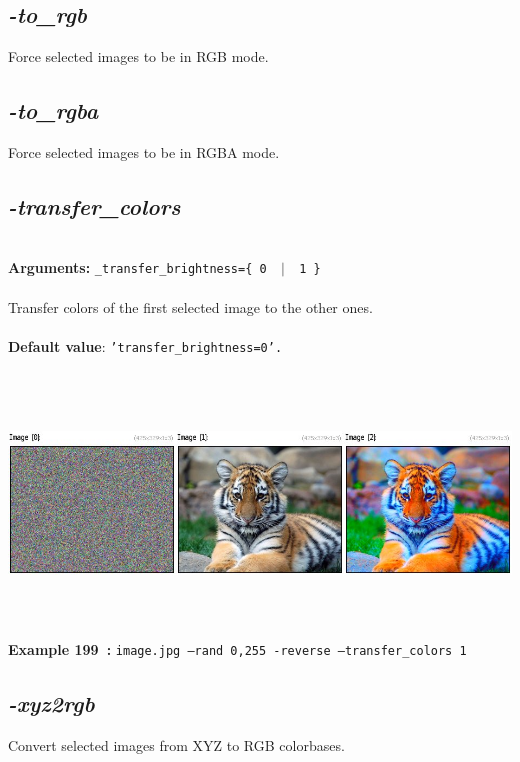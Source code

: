 \documentclass[a4paper,11pt,twoside]{book}
\begin{document}
\subsection{\emph{-to\_rgb} }\vspace*{-0.5em}
Force selected images to be in RGB mode.


\subsection{\emph{-to\_rgba} }\vspace*{-0.5em}
Force selected images to be in RGBA mode.


\subsection{\emph{-transfer\_colors} }\vspace*{-0.5em}
~\\\textbf{Arguments: } 
{\small \texttt{\_transfer\_brightness=\{ 0 ~$|$~ 1 \}}}\\~\\
Transfer colors of the first selected image to the other ones.
~\\~\\\textbf{Default value}: {\small \texttt{'transfer\_brightness=0'.}}
\begin{center}\includegraphics[keepaspectratio=true,height=7cm,width=\textwidth]{img/gmic_def199.jpg}\\
{\footnotesize \textbf{Example 199~:} \texttt{image.jpg --rand 0,255 -reverse --transfer\_colors 1}}
\end{center}

\subsection{\emph{-xyz2rgb} }\vspace*{-0.5em}
Convert selected images from XYZ to RGB colorbases.
\end{document}
